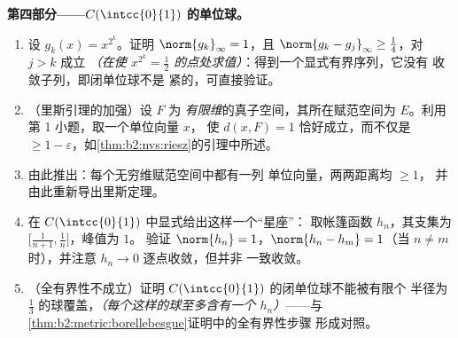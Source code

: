 \begin{problem}
\medskip
\noindent\textbf{第四部分——$C(\intcc{0}{1})$
的单位球。}
\begin{enumerate}[resume]
  \item 设 $g_k(x) = x^{2^k}$。证明 $\norm{g_k}_\infty = 1$，且
        $\norm{g_k - g_j}_\infty \geq \frac14$，对 $j > k$ 成立
        \emph{（在使 $x^{2^k} =
        \frac12$ 的点处求值）}：得到一个显式有界序列，它没有
        收敛子列，即闭单位球不是
        紧的，可直接验证。
  \item （里斯引理的加强）设 $F$ 为
        \emph{有限维}的真子空间，其所在赋范空间为
        $E$。利用第 1 小题，取一个单位向量 $x$，
        使 $d(x, F) = 1$ 恰好成立，而不仅是 $\geq 1 -
        \varepsilon$，如\cref{thm:b2:nvs:riesz}的引理中所述。
  \item 由此推出：每个无穷维赋范空间中都有一列
        单位向量，两两距离均 $\geq 1$，
        并由此重新导出里斯定理。
  \item 在 $C(\intcc{0}{1})$ 中显式给出这样一个“星座”：
        取帐篷函数 $h_n$，其支集为
        $\bigl[\frac1{n+1}, \frac1n\bigr]$，峰值为 $1$。
        验证 $\norm{h_n} = 1$，$\norm{h_n - h_m} = 1$（当 $n
        \neq m$ 时），并注意 $h_n \to 0$ 逐点收敛，但并非
        一致收敛。
  \item （全有界性不成立）证明
        $C(\intcc{0}{1})$ 的闭单位球不能被有限个
        半径为 $\frac13$ 的球覆盖，\emph{（每个这样的球至多含有一个
        $h_n$）}——与
        \cref{thm:b2:metric:borellebesgue}证明中的全有界性步骤
        形成对照。
\end{enumerate}


\end{problem}
